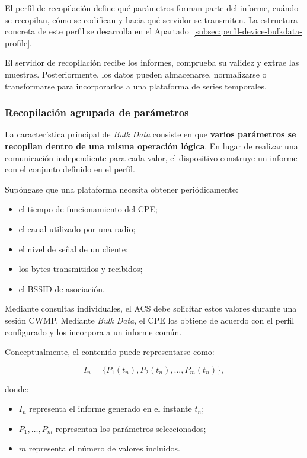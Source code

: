 El perfil de recopilación define qué parámetros forman parte del
informe, cuándo se recopilan, cómo se codifican y hacia qué servidor se
transmiten. La estructura concreta de este perfil se desarrolla en el
Apartado~\ref{subsec:perfil-device-bulkdata-profile}.

El servidor de recopilación recibe los informes, comprueba su validez y
extrae las muestras. Posteriormente, los datos pueden almacenarse,
normalizarse o transformarse para incorporarlos a una plataforma de
series temporales.


\subsubsection*{Recopilación agrupada de parámetros}

La característica principal de \textit{Bulk Data} consiste en que
\textbf{varios parámetros se recopilan dentro de una misma operación
lógica}. En lugar de realizar una comunicación independiente para cada
valor, el dispositivo construye un informe con el conjunto definido en
el perfil.

Supóngase que una plataforma necesita obtener periódicamente:

\begin{itemize}
    \item el tiempo de funcionamiento del CPE;
    \item el canal utilizado por una radio;
    \item el nivel de señal de un cliente;
    \item los bytes transmitidos y recibidos;
    \item el BSSID de asociación.
\end{itemize}

Mediante consultas individuales, el ACS debe solicitar estos valores
durante una sesión CWMP. Mediante \textit{Bulk Data}, el CPE los obtiene
de acuerdo con el perfil configurado y los incorpora a un informe común.

Conceptualmente, el contenido puede representarse como:

\[
    I_n =
    \{
        P_1(t_n),
        P_2(t_n),
        \ldots,
        P_m(t_n)
    \},
\]

donde:

\begin{itemize}
    \item \(I_n\) representa el informe generado en el instante
    \(t_n\);

    \item \(P_1,\ldots,P_m\) representan los parámetros seleccionados;

    \item \(m\) representa el número de valores incluidos.
\end{itemize}

